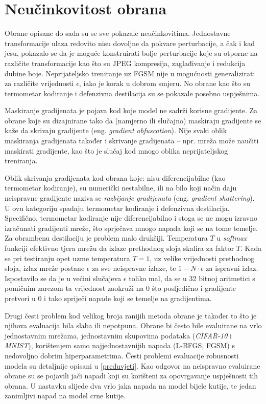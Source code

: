 \documentclass[utf8, diplomski]{fer}
\begin{document}
\section{Neučinkovitost obrana}\label{neucinkovitost}
Obrane opisane do sada su se sve pokazale neučinkovitima. Jednostavne transformacije ulaza redovito nisu dovoljne da pokvare perturbacije, a čak i kad jesu, pokazalo se da je moguće konstruirati bolje perturbacije koje su otporne na različite transformacije kao što su JPEG kompresija, zaglađivanje i redukcija dubine boje. Neprijateljsko treniranje uz FGSM nije u mogućnosti generalizirati za različite vrijednosti $\epsilon$, iako je korak u dobrom smjeru. No obrane kao što su termometar kodiranje i defenzivna destilacija su se pokazale posebno uspješnima. \par
Maskiranje gradijenata je pojava kod koje model ne sadrži korisne gradijente. Za obrane koje su dizajnirane tako da (namjerno ili slučajno) maskiraju gradijente se kaže da skrivaju gradijente (eng. \textit{gradient obfuscation})\citep{obfuscated}. Nije svaki oblik maskiranja gradijenata također i skrivanje gradijenata -- npr. mreža može naučiti maskirati gradijente, kao što je slučaj kod mnogo oblika neprijateljskog treniranja\citep{ensemble_training}. \par
Oblik skrivanja gradijenata kod obrana koje: nisu diferencijabilne (kao termometar kodiranje), su numerički nestabilne, ili na bilo koji način daju neispravne gradijente naziva se \textit{razbijanje gradijenata} (eng. \textit{gradient shattering})\citep{obfuscated}. U ovu kategoriju spadaju termometar kodiranje i defenzivna destilacija. Specifično, termometar kodiranje nije diferencijabilno i stoga se ne mogu izravno izračunati gradijenti mreže, što sprječava mnogo napada koji se na tome temelje. \\ Za obrambenu destilaciju je problem malo drukčiji. Temperatura $T$ u \textit{softmax} funkciji efektivno tjera mrežu da izlaze prethodnog sloja skalira za faktor $T$. Kada se pri testiranju opet uzme temperatura $T = 1$, uz velike vrijednosti prethodnog sloja, izlaz mreže postane $\epsilon$ za sve neispravne izlaze, te $1 - N \cdot \epsilon$ za ispravni izlaz. Ispostavilo se da je u većini slučajeva $\epsilon$ toliko mal, da se u 32 bitnoj aritmetici s pomičnim zarezom ta vrijednost zaokruži na $0$ što posljedično i gradijente pretvori u $0$ i tako spriječi napade koji se temelje na gradijentima. \par
Drugi česti problem kod velikog broja ranijih metoda obrane je također to što je njihova evaluacija bila slaba ili nepotpuna. Obrane bi često bile evaluirane na vrlo jednostavnim mrežama, jednostavnim skupovima podataka (\textit{CIFAR-10} i \textit{MNIST}), korištenjem samo najjednostavnijih napada (L-BFGS, FGSM) s nedovoljno dobrim hiperparametrima. Česti problemi evaluacije robusnosti modela su detaljnije opisani u \ref{preduvjeti}. Kao odgovor na neispravno evaluirane obrane su se pojavili jači napadi koji su korišteni za opovrgavanje uspješnosti tih obrana. U nastavku slijede dva vrlo jaka napada na model bijele kutije, te jedan zanimljivi napad na model crne kutije.
\end{document}
